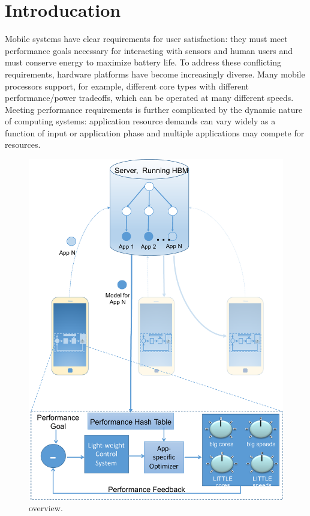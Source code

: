 \section{Introducation}
Mobile systems have clear requirements for user satisfaction: they
must meet performance goals necessary for interacting with sensors and
human users and must conserve energy to maximize battery life.  To
address these conflicting requirements, hardware platforms have become
increasingly diverse.  Many mobile processors support, for example,
different core types with different performance/power tradeoffs, which
can be operated at many different speeds.  Meeting performance
requirements is further complicated by the dynamic nature of computing
systems: application resource demands can vary widely as a function of
input or application phase and multiple applications may compete for
resources.

\begin{figure}
\includegraphics[width=\columnwidth]{figures/mobile-leo-poet.pdf}
\caption{\SYSTEM{} overview.}
  \label{fig:overview}
\end{figure}

